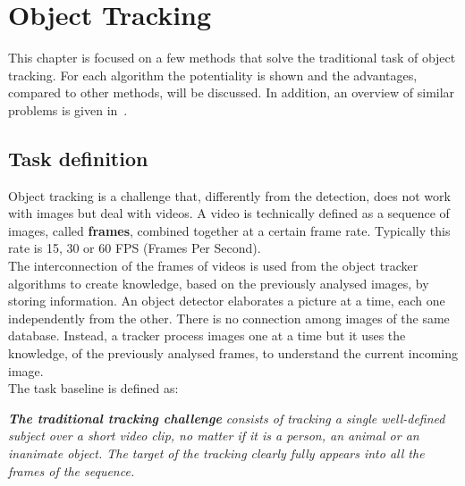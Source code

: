\chapter{Object Tracking} \label{cha:tracking}
This chapter is focused on a few methods that solve the traditional task of object tracking. For each algorithm the potentiality is shown and the advantages, compared to other methods, will be discussed. In addition, an overview of similar problems is given in~.


\section{Task definition} \label{sec:tracking-definition}
Object tracking is a challenge that, differently from the detection, does not work with images but deal with videos. A video is technically defined as a sequence of images, called \textbf{frames}, combined together at a certain frame rate. Typically this rate is 15, 30 or 60 FPS (Frames Per Second).\\
The interconnection of the frames of videos is used from the object tracker algorithms to create knowledge, based on the previously analysed images, by storing information. An object detector elaborates a picture at a time, each one independently from the other. There is no connection among images of the same database. Instead, a tracker process images one at a time but it uses the knowledge, of the previously analysed frames, to understand the current incoming image.\\
The task baseline is defined as:
\begin{tcolorbox}
	\begin{center}
		\textit{\textbf{The traditional tracking challenge} consists of tracking a single well-defined subject over a short video clip, no matter if it is a person, an animal or an inanimate object. The target of the tracking clearly fully appears into all the frames of the sequence.}
	\end{center}
\end{tcolorbox}


